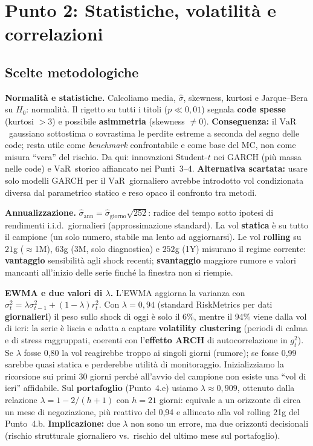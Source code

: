 \documentclass[12pt,a4paper]{article}
\newcommand{\VaR}{\ensuremath{\mathrm{VaR}}}
\begin{document}
\section{Punto 2: Statistiche, volatilità e correlazioni}

\subsection*{Scelte metodologiche}

\textbf{Normalità e statistiche.} Calcoliamo media, $\hat\sigma$, skewness, kurtosi e Jarque--Bera su $H_0$: normalità. Il rigetto su tutti i titoli ($p\ll 0{,}01$) segnala \textbf{code spesse} (kurtosi $>3$) e possibile \textbf{asimmetria} (skewness $\neq 0$). \textbf{Conseguenza:} il \VaR\ gaussiano sottostima o sovrastima le perdite estreme a seconda del segno delle code; resta utile come \emph{benchmark} confrontabile e come base del MC, non come misura ``vera'' del rischio. Da qui: innovazioni Student-$t$ nei GARCH (più massa nelle code) e \VaR\ storico affiancato nei Punti~3--4. \textbf{Alternativa scartata:} usare solo modelli GARCH per il \VaR\ giornaliero avrebbe introdotto vol condizionata diversa dal parametrico statico e reso opaco il confronto tra metodi.

\textbf{Annualizzazione.} $\hat\sigma_{\mathrm{ann}}=\hat\sigma_{\mathrm{giorno}}\sqrt{252}$: radice del tempo sotto ipotesi di rendimenti i.i.d.\ giornalieri (approssimazione standard). La vol \textbf{statica} è su tutto il campione (un solo numero, stabile ma lento ad aggiornarsi). Le vol \textbf{rolling} su $21$g ($\approx$1M), $63$g (3M, solo diagnostica) e $252$g (1Y) misurano il regime corrente: \textbf{vantaggio} sensibilità agli shock recenti; \textbf{svantaggio} maggiore rumore e valori mancanti all'inizio delle serie finché la finestra non si riempie.

\textbf{EWMA e due valori di $\lambda$.} L'EWMA aggiorna la varianza con $\sigma_t^2=\lambda\sigma_{t-1}^2+(1-\lambda)r_t^2$. Con $\lambda=0{,}94$ (standard RiskMetrics per dati \textbf{giornalieri}) il peso sullo shock di oggi è solo il 6\%, mentre il 94\% viene dalla vol di ieri: la serie è liscia e adatta a captare \textbf{volatility clustering} (periodi di calma e di stress raggruppati, coerenti con l'\textbf{effetto ARCH} di autocorrelazione in $g_t^2$). Se $\lambda$ fosse 0,80 la vol reagirebbe troppo ai singoli giorni (rumore); se fosse 0,99 sarebbe quasi statica e perderebbe utilità di monitoraggio. Inizializziamo la ricorsione sui primi $30$ giorni perché all'avvio del campione non esiste una ``vol di ieri'' affidabile. Sul \textbf{portafoglio} (Punto~4.e) usiamo $\lambda\approx 0{,}909$, ottenuto dalla relazione $\lambda=1-2/(h+1)$ con $h=21$ giorni: equivale a un orizzonte di circa un mese di negoziazione, più reattivo del 0,94 e allineato alla vol rolling 21g del Punto~4.b. \textbf{Implicazione:} due $\lambda$ non sono un errore, ma due orizzonti decisionali (rischio strutturale giornaliero vs.\ rischio del ultimo mese sul portafoglio).
\end{document}
